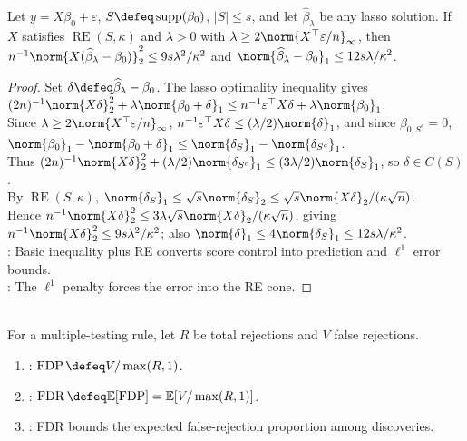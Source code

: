 \begin{theorem} \label{thm:lasso-basic-rate-form} \\
Let $y=X\beta_0+\varepsilon$, $S\defeq\operatorname{supp}(\beta_0)$, $|S|\leq s$, and let $\widehat{\beta}_\lambda$ be any lasso solution. If $X$ satisfies $\operatorname{RE}(S,\kappa)$ and $\lambda>0$ with $\lambda\geq2\norm{X^\top\varepsilon/n}_\infty$, then $n^{-1}\norm{X(\widehat{\beta}_\lambda-\beta_0)}_2^2\leq9s\lambda^2/\kappa^2$ and $\norm{\widehat{\beta}_\lambda-\beta_0}_1\leq12s\lambda/\kappa^2$.
\begin{proof} Set $\delta\defeq\widehat{\beta}_\lambda-\beta_0$. The lasso optimality inequality gives $(2n)^{-1}\norm{X\delta}_2^2+\lambda\norm{\beta_0+\delta}_1\leq n^{-1}\varepsilon^\top X\delta+\lambda\norm{\beta_0}_1$.\\
Since $\lambda\geq2\norm{X^\top\varepsilon/n}_\infty$, $n^{-1}\varepsilon^\top X\delta\leq(\lambda/2)\norm{\delta}_1$, and since $\beta_{0,S^c}=0$, $\norm{\beta_0}_1-\norm{\beta_0+\delta}_1\leq\norm{\delta_S}_1-\norm{\delta_{S^c}}_1$.\\
Thus $(2n)^{-1}\norm{X\delta}_2^2+(\lambda/2)\norm{\delta_{S^c}}_1\leq(3\lambda/2)\norm{\delta_S}_1$, so $\delta\in C(S)$.\\
By $\operatorname{RE}(S,\kappa)$, $\norm{\delta_S}_1\leq\sqrt{s}\norm{\delta_S}_2\leq\sqrt{s}\norm{X\delta}_2/(\kappa\sqrt{n})$.\\
Hence $n^{-1}\norm{X\delta}_2^2\leq3\lambda\sqrt{s}\norm{X\delta}_2/(\kappa\sqrt{n})$, giving $n^{-1}\norm{X\delta}_2^2\leq9s\lambda^2/\kappa^2$; also $\norm{\delta}_1\leq4\norm{\delta_S}_1\leq12s\lambda/\kappa^2$.\\
: Basic inequality plus RE converts score control into prediction and $\ell^1$ error bounds.\\
: The $\ell^1$ penalty forces the error into the RE cone.
\end{proof}
\end{theorem}

\begin{definition} \label{def:false-discovery-rate} \\
For a multiple-testing rule, let $R$ be total rejections and $V$ false rejections.
\begin{enumerate}[label=(\roman*)]
\setlength{\itemsep}{0pt}
\item {}: $\operatorname{FDP}\defeq V/\max(R,1)$.
\item {}: $\operatorname{FDR}\defeq\mathbb{E}[\operatorname{FDP}]=\mathbb{E}[V/\max(R,1)]$.
\item {}: FDR bounds the expected false-rejection proportion among discoveries.
\end{enumerate}
\end{definition}

